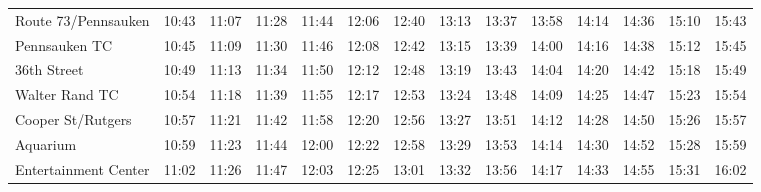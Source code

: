 \begin{center}
\begin{tabular}{@{}lrrrrrrrrrrrrr@{}}
Route 73/Pennsauken & 10:43 & 11:07 & 11:28 & 11:44 & 12:06 & 12:40 & 13:13 & 13:37 & 13:58 & 14:14 & 14:36 & 15:10 & 15:43 \\
Pennsauken TC & 10:45 & 11:09 & 11:30 & 11:46 & 12:08 & 12:42 & 13:15 & 13:39 & 14:00 & 14:16 & 14:38 & 15:12 & 15:45 \\
36th Street & 10:49 & 11:13 & 11:34 & 11:50 & 12:12 & 12:48 & 13:19 & 13:43 & 14:04 & 14:20 & 14:42 & 15:18 & 15:49 \\
Walter Rand TC & 10:54 & 11:18 & 11:39 & 11:55 & 12:17 & 12:53 & 13:24 & 13:48 & 14:09 & 14:25 & 14:47 & 15:23 & 15:54 \\
Cooper St/Rutgers & 10:57 & 11:21 & 11:42 & 11:58 & 12:20 & 12:56 & 13:27 & 13:51 & 14:12 & 14:28 & 14:50 & 15:26 & 15:57 \\
Aquarium & 10:59 & 11:23 & 11:44 & 12:00 & 12:22 & 12:58 & 13:29 & 13:53 & 14:14 & 14:30 & 14:52 & 15:28 & 15:59 \\
Entertainment Center & 11:02 & 11:26 & 11:47 & 12:03 & 12:25 & 13:01 & 13:32 & 13:56 & 14:17 & 14:33 & 14:55 & 15:31 & 16:02 \\
\bottomrule\end{tabular}\end{center}

